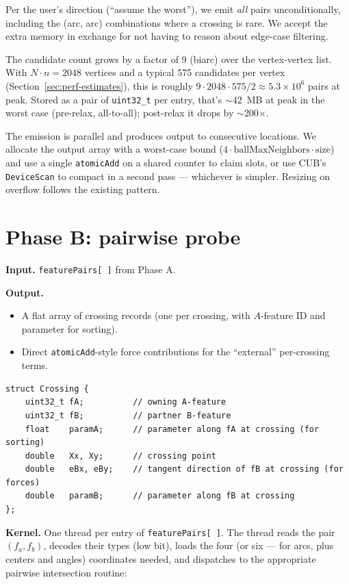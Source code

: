 \documentclass[11pt]{article}
\newcommand{\code}[1]{\texttt{#1}}
\begin{document}
Per the user's direction (``assume the worst''), we emit \emph{all}
pairs unconditionally, including the (arc, arc) combinations where a
crossing is rare. We accept the extra memory in exchange for not
having to reason about edge-case filtering.

The candidate count grows by a factor of 9 (biarc) over the
vertex-vertex list. With $N \cdot n = 2048$ vertices and a typical 575
candidates per vertex (Section~\ref{sec:perf-estimates}), this is
roughly $9 \cdot 2048 \cdot 575 / 2 \approx 5.3 \times 10^6$
pairs at peak. Stored as a pair of \code{uint32\_t} per entry, that's
$\sim$42~MB at peak in the worst case (pre-relax, all-to-all);
post-relax it drops by $\sim$200$\times$.

The emission is parallel and produces output to consecutive locations.
We allocate the output array with a worst-case bound
($4 \cdot \text{ballMaxNeighbors} \cdot \text{size}$) and use a single
\code{atomicAdd} on a shared counter to claim slots, or use CUB's
\code{DeviceScan} to compact in a second pass --- whichever is
simpler. Resizing on overflow follows the existing pattern.

\section{Phase B: pairwise probe}\label{sec:phaseB}

\textbf{Input.} \code{featurePairs[\,]} from Phase A.

\textbf{Output.}
\begin{itemize}[leftmargin=*]
  \item A flat array of crossing records (one per crossing, with
        $A$-feature ID and parameter for sorting).
  \item Direct \code{atomicAdd}-style force contributions for the
        ``external'' per-crossing terms.
\end{itemize}

\begin{lstlisting}
struct Crossing {
    uint32_t fA;          // owning A-feature
    uint32_t fB;          // partner B-feature
    float    paramA;      // parameter along fA at crossing (for sorting)
    double   Xx, Xy;      // crossing point
    double   eBx, eBy;    // tangent direction of fB at crossing (for forces)
    double   paramB;      // parameter along fB at crossing
};
\end{lstlisting}

\textbf{Kernel.} One thread per entry of \code{featurePairs[\,]}. The
thread reads the pair $(f_a, f_b)$, decodes their types (low bit),
loads the four (or six --- for arcs, plus centers and angles) coordinates
needed, and dispatches to the appropriate pairwise intersection
routine:
\end{document}
